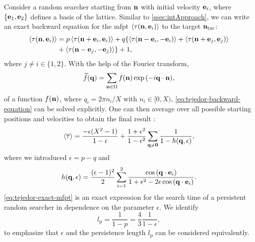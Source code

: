 Consider a random searcher starting from $\bv{n}$ with initial velocity $\bv{e}_i$, where $\{\bv{e}_1, \bv{e}_2\}$ defines a basis of the lattice. Similar to \autoref{ssec:intApproach}, we can write an exact backward equation for the \ac{mfpt} $\mfpt[\tau(\bv{n},\bv{e}_i)]$ to the target $\bv{n}_\textrm{tar}$:
\begin{equation}\label{eq:tejedor-backward-equation}
 \begin{aligned}
  \mfpt[\tau(\bv{n},\bv{e}_i)] &= p \mfpt[\tau(\bv{n} + \bv{e}_i,\bv{e}_i)] + q \{ \mfpt[\tau(\bv{n} - \bv{e}_i,-\bv{e}_i)] + \mfpt[\tau(\bv{n} + \bv{e}_j,\bv{e}_j)] 
  \\
  &+ \mfpt[\tau(\bv{n} - \bv{e}_j,-\bv{e}_j)] \} + 1,
 \end{aligned}
\end{equation}
where $j \neq i \in \{1,2\}$. With the help of the Fourier transform,
\begin{equation*}
 \fourier{f}(\bv{q}) = \sum\limits_{\bv{n} \in \Omega} f(\bv{n}) \exp{(-i \bv{q} \cdot \bv{n})},
\end{equation*}
of a function $f(\bv{n})$, where $q_i = 2\pi n_i / X$ with $n_i \in [0, X)$, \autoref{eq:tejedor-backward-equation} can be solved explicitly. One can then average over all possible starting positions and velocities to obtain the final result \cite{tejedor:2012}:
\begin{equation}\label{eq:tejedor-exact-mfpt}
 \mfpt[\mean{\tau}] = \frac{-\epsilon(X^2 - 1)}{1 - \epsilon} + \frac{1+\epsilon^2}{1-\epsilon^2} \sum\limits_{\bv{q} \neq \bv{0}} \frac{1}{1 - h(\bv{q}, \epsilon)},
\end{equation}
where we introduced $\epsilon = p-q$ and
\begin{equation*}
 h(\bv{q},\epsilon) = \frac{(\epsilon -1)^2}{2} \sum\limits_{i=1}^2\frac{\cos{(\bv{q}\cdot\bv{e}_i)}}{1+ \epsilon^2 - 2\epsilon\cos{(\bv{q}\cdot\bv{e}_i)}}.
\end{equation*}
\autoref{eq:tejedor-exact-mfpt} is an exact expression for the search time of a persistent random searcher in dependence on the parameter $\epsilon$. We identify
\begin{equation*}
 l_\textrm{p} = \frac{1}{1-p} = \frac{4}{3} \frac{1}{1-\epsilon},
\end{equation*}
to emphasize that $\epsilon$ and the persistence length $l_\textrm{p}$ can be considered equivalently.

